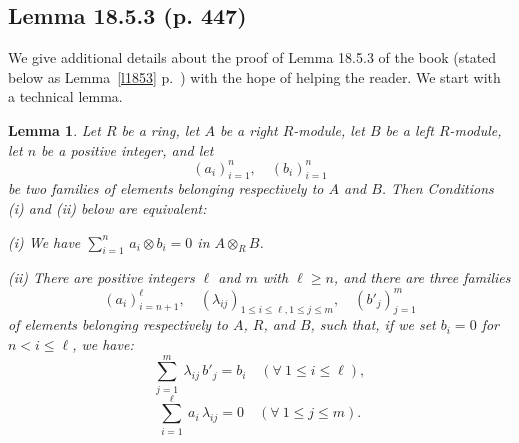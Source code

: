 \documentclass[12pt]{article}
\newtheorem{lem}[thm]{Lemma}
\theoremstyle{remark}
\theoremstyle{definition}
\newcommand{\nn}{\noindent}
\begin{document}

\subsection{Lemma 18.5.3 (p. 447)} 

We give additional details about the proof of Lemma 18.5.3 of the book (stated below as Lemma~\ref{l1853} p.~\pageref{l1853}) with the hope of helping the reader. We start with a technical lemma.

\begin{lem}\label{techlem}
Let $R$ be a ring, let $A$ be a right $R$-module, let $B$ be a left $R$-module, let $n$ be a positive integer, and let 
$$
(a_i)_{i=1}^n,\quad(b_i)_{i=1}^n
$$
be two families of elements belonging respectively to $A$ and $B$. Then Conditions \emph{(i)} and \emph{(ii)} below are equivalent:

\nn\emph{(i)} We have $\sum_{i=1}^n\,a_i\otimes b_i=0$ in $A\otimes_RB$. 

\nn\emph{(ii)} There are positive integers $\ell$ and $m$ with $\ell\ge n$, and there are three families 
$$
(a_i)_{i=n+1}^\ell,\quad(\lambda_{ij})_{1\le i\le\ell,1\le j\le m},\quad(b'_j)_{j=1}^m
$$ 
of elements belonging respectively to $A$, $R$, and $B$, such that, if we set $b_i=0$ for $n<i\le\ell$, we have:
%
\begin{equation}\label{lij1}
\sum_{j=1}^m\ \lambda_{ij}\,b'_j=b_i\quad(\forall\ 1\le i\le\ell),
\end{equation}
%
\begin{equation}\label{lij2}
\sum_{i=1}^\ell\ a_i\,\lambda_{ij}=0\quad(\forall\ 1\le j\le m).
\end{equation}
\end{lem} 
\end{document}
